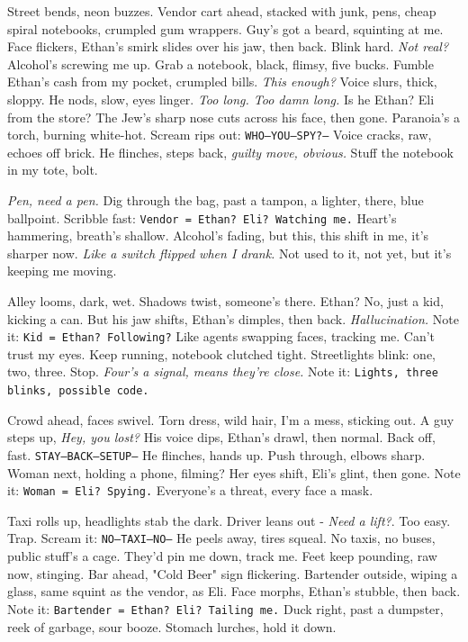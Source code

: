 \documentclass[12pt,oneside]{book}
\newcommand{\note}[1]{\texttt{#1}}
\begin{document}
Street bends, neon buzzes. Vendor cart ahead, stacked with junk, pens, cheap spiral notebooks, crumpled gum wrappers. Guy’s got a beard, squinting at me. Face flickers, Ethan’s smirk slides over his jaw, then back. Blink hard. \textit{Not real?} Alcohol’s screwing me up. Grab a notebook, black, flimsy, five bucks. Fumble Ethan’s cash from my pocket, crumpled bills. \textit{This enough?} Voice slurs, thick, sloppy. He nods, slow, eyes linger. \textit{Too long. Too damn long.} Is he Ethan? \textnormal{Eli} from the store? The Jew’s sharp nose cuts across his face, then gone. Paranoia’s a torch, burning white-hot. Scream rips out: \note{WHO—YOU—SPY?—} Voice cracks, raw, echoes off brick. He flinches, steps back, \textit{guilty move, obvious.} Stuff the notebook in my tote, bolt.

\textit{Pen, need a pen.} Dig through the bag, past a tampon, a lighter, there, blue ballpoint. Scribble fast: \note{Vendor = Ethan? Eli? Watching me.} Heart’s hammering, breath’s shallow. Alcohol’s fading, but this, this shift in me, it’s sharper now. \textit{Like a switch flipped when I drank.} Not used to it, not yet, but it’s keeping me moving.

Alley looms, dark, wet. Shadows twist, someone’s there. Ethan? No, just a kid, kicking a can. But his jaw shifts, Ethan’s dimples, then back. \textit{Hallucination.} Note it: \note{Kid = Ethan? Following?} Like agents swapping faces, tracking me. Can’t trust my eyes. Keep running, notebook clutched tight. Streetlights blink: one, two, three. Stop. \textit{Four’s a signal, means they’re close.} Note it: \note{Lights, three blinks, possible code.}

Crowd ahead, faces swivel. Torn dress, wild hair, I’m a mess, sticking out. A guy steps up, \textit{Hey, you lost?} His voice dips, Ethan’s drawl, then normal. Back off, fast. \note{STAY—BACK—SETUP—} He flinches, hands up. Push through, elbows sharp. Woman next, holding a phone, filming? Her eyes shift, \textnormal{Eli}’s glint, then gone. Note it: \note{Woman = Eli? Spying.} Everyone’s a threat, every face a mask.

Taxi rolls up, headlights stab the dark. Driver leans out - \textit{Need a lift?}. Too easy. Trap. Scream it: \note{NO—TAXI—NO—} He peels away, tires squeal. No taxis, no buses, public stuff’s a cage. They’d pin me down, track me. Feet keep pounding, raw now, stinging. Bar ahead, "Cold Beer" sign flickering. Bartender outside, wiping a glass, same squint as the vendor, as \textnormal{Eli}. Face morphs, Ethan’s stubble, then back. Note it: \note{Bartender = Ethan? Eli? Tailing me.} Duck right, past a dumpster, reek of garbage, sour booze. Stomach lurches, hold it down.
\end{document}
